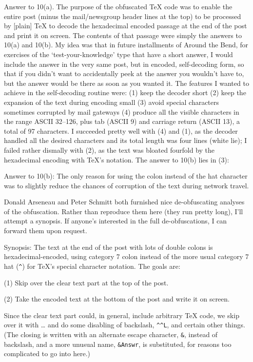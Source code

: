 
Answer to 10(a). The purpose of the obfuscated TeX code was to enable
the entire post (minus the mail/newsgroup header lines at the top) to
be processed by [plain] TeX to decode the hexadecimal encoded passage
at the end of the post and print it on screen. The contents of that
passage were simply the answers to 10(a) and 10(b). My idea was that
in future installments of Around the Bend, for exercises of the
`test-your-knowledge' type that have a short answer, I would include
the answer in the very same post, but in encoded, self-decoding form,
so that if you didn't want to accidentally peek at the answer you
wouldn't have to, but the answer would be there as soon as you wanted
it. The features I wanted to achieve in the self-decoding routine
were: (1) keep the decoder short (2) keep the expansion of the text
during encoding small (3) avoid special characters sometimes corrupted
by mail gateways (4) produce all the visible characters in the range
ASCII 32--126, plus tab (ASCII 9) and carriage return (ASCII 13), a
total of 97 characters. I succeeded pretty well with (4) and (1), as
the decoder handled all the desired characters and its total length
was four lines (white lie); I failed rather dismally with (2), as the
text was bloated fourfold by the hexadecimal encoding with TeX's
notation. The answer to 10(b) lies in (3):

Answer to 10(b): The only reason for using the colon instead of the hat
character was to slightly reduce the chances of corruption of the text
during network travel.

Donald Arseneau and Peter Schmitt
 both furnished nice de-obfuscating
analyses of the obfuscation. Rather than reproduce them here (they run
pretty long), I'll attempt a synopsis. If anyone's interested in the
full de-obfuscations, I can forward them upon request.

Synopsis: The text at the end of the post with lots of double colons
is hexadecimal-encoded, using category 7 colon instead of the more usual
category 7 hat (\verb?^?) for TeX's special character notation. The goals are:

(1) Skip over the clear text part at the top of the post.

(2) Take the encoded text at the bottom of the post and write it on
screen.

Since the clear text part could, in general, include arbitrary TeX
code, we skip over it with  \ldots {} and do some disabling of
backslash, \verb?^^L?, and certain other things. (The closing  is written
with an alternate escape character, \verb?&?, instead of backslash, and a
more unusual name, \verb?&Answr?, is substituted, for reasons too complicated
to go into here.)

